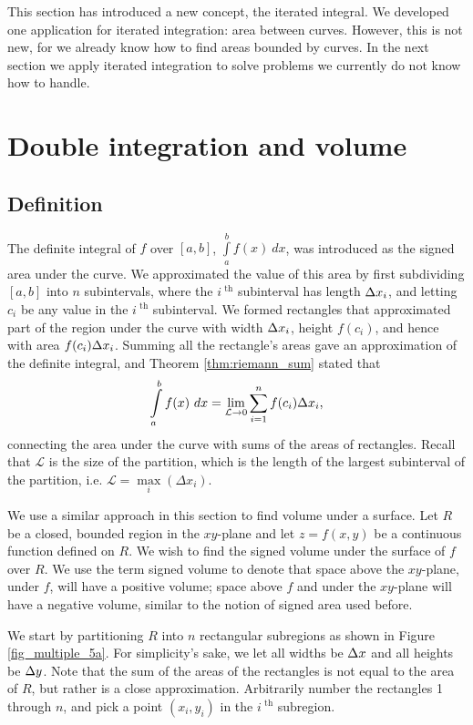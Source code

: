 This section has introduced a new concept, the iterated integral. We developed one application for iterated integration: area between curves. However, this is not new, for we already know how to find areas bounded by curves. In the next section we apply iterated integration to solve problems we currently do not know how to handle. 


\section{Double integration and volume}\label{sec:double_int_volume}
\subsection{Definition}

The definite integral of $f$ over $[a,b]$, $\int\limits_a^b f(x)\ dx$, was introduced as the signed area under the curve. We approximated the value of this area by first subdividing $[a,b]$ into $n$ subintervals, where the $i^\text{ th}$ subinterval has length $\Delta x_i$, and letting $c_i$ be any value in the $i^\text{ th}$ subinterval. We formed rectangles that approximated part of the region under the curve with width $\Delta x_i$, height $f(c_i)$, and hence with area $f(c_i)\Delta x_i$. Summing all the rectangle's areas gave an approximation of the definite integral, and Theorem \ref{thm:riemann_sum} stated that
$$\int\limits_a^bf(x)\ dx = \lim_{\mathcal{L}\to 0}\sum\limits^{n}_{i=1} f(c_i)\Delta x_i,$$
connecting the area under the curve with sums of the areas of rectangles. Recall that $\mathcal{L}$ is the  size of the partition, which is the length of the largest subinterval of the partition, i.e. $\mathcal{L}=\max\limits_i\left(\Delta x_i\right)$.

We use a similar approach in this section to find volume under a surface. Let $R$ be a closed, bounded region in the $xy$-plane and let $z=f(x,y)$ be a continuous function defined on $R$. We wish to find the signed volume under the surface of $f$ over $R$. We use the term signed volume to denote that space above the $xy$-plane, under $f$, will have a positive volume; space above $f$ and under the $xy$-plane will have a negative volume, similar to the notion of signed area used before.

We start by partitioning $R$ into $n$ rectangular subregions as shown in Figure \ref{fig_multiple_5a}. For simplicity's sake, we let all widths be $\Delta x$ and all heights be $\Delta y$. Note that the sum of the areas of the rectangles is not equal to the area of $R$, but rather is a close approximation. Arbitrarily number the rectangles 1 through $n$, and pick a point $(x_i,y_i)$ in the $i^\text{ th}$ subregion. 


